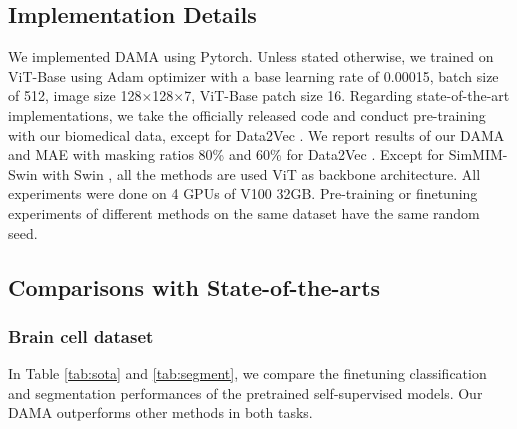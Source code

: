 \documentclass[10pt,twocolumn,letterpaper]{article}
\begin{document}
\subsection{Implementation Details}
We implemented DAMA using Pytorch. Unless stated otherwise, we trained on ViT-Base using Adam optimizer \cite{adam} with a base learning rate of 0.00015, batch size of 512, image size 128$\times$128$\times$7, ViT-Base patch size 16. Regarding state-of-the-art implementations, we take the officially released code \cite{mocov3,mae,deit} and conduct pre-training with our biomedical data, except for Data2Vec \cite{data2vec}.
We report results of our DAMA and MAE \cite{mae} with masking ratios 80\% and 60\% for Data2Vec \cite{data2vec}. Except for SimMIM-Swin with Swin \cite{swin}, all the methods are used ViT \cite{vit} as backbone architecture. All experiments were done on 4 GPUs of V100 32GB. Pre-training or finetuning experiments of different methods on the same dataset have the same random seed.

\subsection{Comparisons with State-of-the-arts}
\subsubsection{Brain cell dataset} In Table \ref{tab:sota} and \ref{tab:segment}, we compare the finetuning classification and segmentation performances of the pretrained self-supervised models. Our DAMA outperforms other methods in both tasks.
\end{document}
